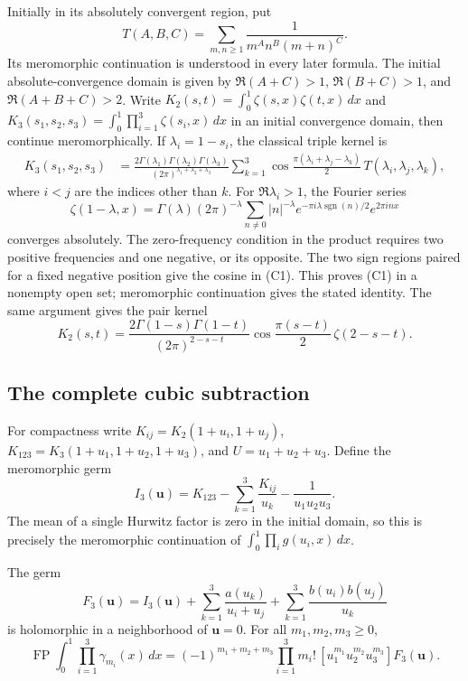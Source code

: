 Initially in its absolutely convergent region, put
\[
 T(A,B,C)=\sum_{m,n\ge1}\frac1{m^A n^B(m+n)^C}.
\]
Its meromorphic continuation is understood in every later formula.
The initial absolute-convergence domain is given by
$\Re(A+C)>1$, $\Re(B+C)>1$, and $\Re(A+B+C)>2$.
Write $K_2(s,t)=\int_0^1\zeta(s,x)\zeta(t,x)\,dx$ and
$K_3(s_1,s_2,s_3)=\int_0^1\prod_{i=1}^3\zeta(s_i,x)\,dx$ in an
initial convergence domain, then continue meromorphically.
If $\lambda_i=1-s_i$, the classical triple kernel is
\begin{align}
 K_3(s_1,s_2,s_3)
 &=\frac{2\Gamma(\lambda_1)\Gamma(\lambda_2)\Gamma(\lambda_3)}
          {(2\pi)^{\lambda_1+\lambda_2+\lambda_3}}
 \sum_{k=1}^3
 \cos\frac{\pi(\lambda_i+\lambda_j-\lambda_k)}2\,
 T(\lambda_i,\lambda_j,\lambda_k),             \tag{C1}\label{cub:C1}
\end{align}
where $i<j$ are the indices other than $k$.
For $\Re\lambda_i>1$, the Fourier series
\[
 \zeta(1-\lambda,x)=\Gamma(\lambda)(2\pi)^{-\lambda}
 \sum_{n\ne0}|n|^{-\lambda}
       e^{-\pi i\lambda\operatorname{sgn}(n)/2}e^{2\pi inx}
\]
converges absolutely.  The zero-frequency condition in the product
requires two positive frequencies and one negative, or its opposite.
The two sign regions paired for a fixed negative position give the
cosine in (C1). This proves (C1) in a nonempty open set; meromorphic
continuation gives the stated identity. The same argument gives the pair kernel
\[
K_2(s,t)=\frac{2\Gamma(1-s)\Gamma(1-t)}{(2\pi)^{2-s-t}}
\cos\frac{\pi(s-t)}2\,\zeta(2-s-t).
\]

\subsection{The complete cubic subtraction}

For compactness write $K_{ij}=K_2(1+u_i,1+u_j)$,
$K_{123}=K_3(1+u_1,1+u_2,1+u_3)$, and $U=u_1+u_2+u_3$.
Define the meromorphic germ
\[
 I_3(\boldsymbol u)=K_{123}-\sum_{k=1}^3\frac{K_{ij}}{u_k}
                    -\frac1{u_1u_2u_3}.        \tag{C2}\label{cub:C2}
\]
The mean of a single Hurwitz factor is zero in the initial domain, so
this is precisely the meromorphic continuation of
$\int_0^1\prod_i g(u_i,x)\,dx$.

\begin{theorem}
The germ
\[
 F_3(\boldsymbol u)=I_3(\boldsymbol u)
   +\sum_{k=1}^3\frac{a(u_k)}{u_i+u_j}
   +\sum_{k=1}^3\frac{b(u_i)b(u_j)}{u_k}       \tag{C3}\label{cub:C3}
\]
is holomorphic in a neighborhood of $\boldsymbol u=0$. For all
$m_1,m_2,m_3\ge0$,
\[
 \operatorname{FP}\int_0^1\prod_{i=1}^3\gamma_{m_i}(x)\,dx
 =(-1)^{m_1+m_2+m_3}\prod_{i=1}^3m_i!\,
   [u_1^{m_1}u_2^{m_2}u_3^{m_3}]F_3(\boldsymbol u). \tag{C4}\label{cub:C4}
\]
\end{theorem}

